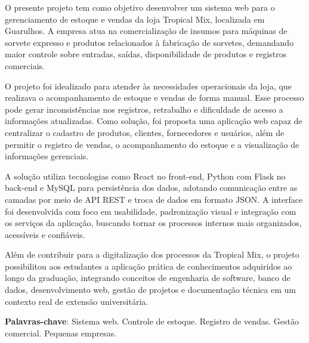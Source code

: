 \begin{resumo}

O presente projeto tem como objetivo desenvolver um sistema web para o gerenciamento de estoque e vendas da loja Tropical Mix, localizada em Guarulhos. A empresa atua na comercialização de insumos para máquinas de sorvete expresso e produtos relacionados à fabricação de sorvetes, demandando maior controle sobre entradas, saídas, disponibilidade de produtos e registros comerciais.

O projeto foi idealizado para atender às necessidades operacionais da loja, que realizava o acompanhamento de estoque e vendas de forma manual. Esse processo pode gerar inconsistências nos registros, retrabalho e dificuldade de acesso a informações atualizadas. Como solução, foi proposta uma aplicação web capaz de centralizar o cadastro de produtos, clientes, fornecedores e usuários, além de permitir o registro de vendas, o acompanhamento do estoque e a visualização de informações gerenciais.

A solução utiliza tecnologias como React no front-end, Python com Flask no back-end e MySQL para persistência dos dados, adotando comunicação entre as camadas por meio de API REST e troca de dados em formato JSON. A interface foi desenvolvida com foco em usabilidade, padronização visual e integração com os serviços da aplicação, buscando tornar os processos internos mais organizados, acessíveis e confiáveis.

Além de contribuir para a digitalização dos processos da Tropical Mix, o projeto possibilitou aos estudantes a aplicação prática de conhecimentos adquiridos ao longo da graduação, integrando conceitos de engenharia de software, banco de dados, desenvolvimento web, gestão de projetos e documentação técnica em um contexto real de extensão universitária.

\textbf{Palavras-chave}: Sistema web. Controle de estoque. Registro de vendas. Gestão comercial. Pequenas empresas.

\end{resumo}


